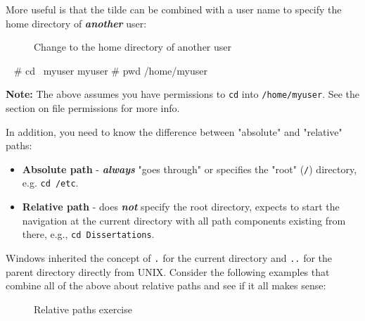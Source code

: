 \documentclass[10pt,american,]{book}
\newenvironment{Shaded}{\begin{snugshade}}{\end{snugshade}}
\newcommand{\KeywordTok}[1]{\textcolor[rgb]{0.13,0.29,0.53}{\textbf{{#1}}}}
\newcommand{\CommentTok}[1]{\textcolor[rgb]{0.56,0.35,0.01}{\textit{{#1}}}}
\newcommand{\NormalTok}[1]{{#1}}
\numberwithin{figure}{chapter}
\DeclareRobustCommand{\drcap}[1]{\begin{figure}[H]\caption{#1}\end{figure}}
\renewcommand{\KeywordTok}[1]{{#1}}
\renewcommand{\CommentTok}[1]{{#1}}
\renewcommand{\NormalTok}[1]{{#1}}
\begin{document}
More useful is that the tilde can be combined with a user name to
specify the home directory of \textbf{\emph{another}} user:

\drcap{Change to the home directory of another user}

\begin{Shaded}
\begin{Highlighting}[]
\KeywordTok{~} \CommentTok{# cd ~myuser}
\KeywordTok{myuser} \CommentTok{# pwd}
\KeywordTok{/home/myuser}
\end{Highlighting}
\end{Shaded}

\textbf{Note:} The above assumes you have permissions to \texttt{cd}
into \texttt{/home/myuser}. See the section on file permissions for more
info.

In addition, you need to know the difference between "absolute" and
"relative" paths:

\begin{itemize}
\item
  \textbf{Absolute path} - \textbf{\emph{always}} "goes through" or
  specifies the "root" (\texttt{/}) directory, e.g. \texttt{cd\ /etc}.
\item
  \textbf{Relative path} - does \textbf{\emph{not}} specify the root
  directory, expects to start the navigation at the current directory
  with all path components existing from there, e.g.,
  \texttt{cd\ Dissertations}.
\end{itemize}

Windows inherited the concept of \texttt{.} for the current directory
and \texttt{..} for the parent directory directly from UNIX. Consider
the following examples that combine all of the above about relative
paths and see if it all makes sense:

\drcap{Relative paths exercise}

\begin{Shaded}
\end{Shaded}
\end{document}
